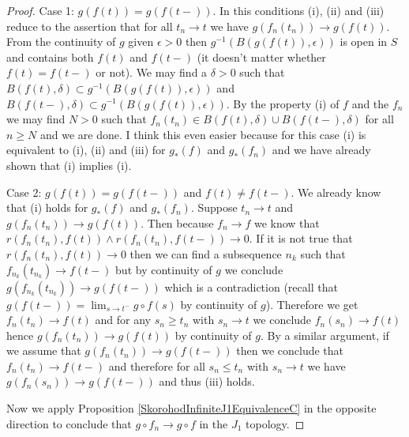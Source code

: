\documentclass{amsbook}
\theoremstyle{definition}
\theoremstyle{remark}
\begin{document}
\begin{proof}
Case 1: $g(f(t)) = g(f(t-))$.  In this conditions (i), (ii) and (iii) reduce to the assertion that for all $t_n \to t$ we have $g(f_n(t_n)) \to g(f(t))$. From the continuity of $g$ given $\epsilon > 0$ then $g^{-1}(B(g(f(t)), \epsilon))$ is open in $S$ and contains both $f(t)$ and $f(t-)$ (it doesn't matter whether $f(t) = f(t-)$ or not).  We may find a $\delta >0$ such that $B(f(t), \delta) \subset g^{-1}(B(g(f(t)), \epsilon))$ and $B(f(t-), \delta) \subset g^{-1}(B(g(f(t)), \epsilon))$.  By the property (i) of $f$ and the $f_n$ we may find $N>0$ such that $f_n(t_n) \in B(f(t), \delta) \cup B(f(t-), \delta)$ for all $n \geq N$ and we are done.  I think this even easier because for this case (i) is equivalent to (i), (ii) and (iii) for $g_*(f)$ and $g_*(f_n)$ and we have already shown that (i) implies (i).
 
Case 2:  $g(f(t)) = g(f(t-))$ and $f(t) \neq f(t-)$.   We already know that (i) holds for $g_*(f)$ and $g_*(f_n)$.  Suppose $t_n \to t$ and $g(f_n(t_n)) \to g(f(t))$.  Then because $f_n \to f$ we know that $r(f_n(t_n), f(t)) \wedge r(f_n(t_n), f(t-)) \to 0$. If it is not true that $r(f_n(t_n), f(t)) \to 0$ then we can find a subsequence $n_k$ such that $f_{n_k}(t_{n_k}) \to f(t-)$ but by continuity of $g$ we conclude $g(f_{n_k}(t_{n_k})) \to g(f(t-))$ which is a contradiction (recall that $g(f(t-)) = \lim_{s \to t^-} g \circ f(s)$ by continuity of $g$).  Therefore we get $f_n(t_n) \to f(t)$ and for any $s_n \geq t_n$ with $s_n \to t$ we conclude $f_n(s_n) \to f(t)$ hence $g(f_n(t_n)) \to g(f(t))$ by continuity of $g$.  By a similar argument, if we assume that $g(f_n(t_n)) \to g(f(t-))$ then we conclude that $f_n(t_n) \to f(t-)$ and therefore for all $s_n \leq t_n$ with $s_n \to t$ we have $g(f_n(s_n)) \to g(f(t-))$ and thus (iii) holds.

Now we apply Proposition \ref{SkorohodInfiniteJ1EquivalenceC} in the opposite direction to conclude that $g \circ f_n \to g \circ f$ in the $J_1$ topology.
\end{proof}
\end{document}
